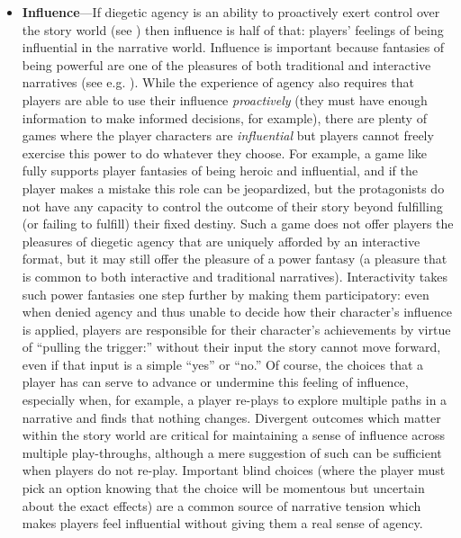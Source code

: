 \begin{itemize}
\item \textbf{Influence}---If diegetic agency is an ability to proactively exert control over the story world (see \citep{Mason2013}) then influence is half of that: players' feelings of being influential in the narrative world.
%
Influence is important because fantasies of being powerful are one of the pleasures of both traditional and interactive narratives (see e.g. \citep{Olson2008}).
%
While the experience of agency also requires that players are able to use their influence \emph{proactively} (they must have enough information to make informed decisions, for example), there are plenty of games where the player characters are \emph{influential} but players cannot freely exercise this power to do whatever they choose.
%
For example, a game like  \citep{FinalFantasy} fully supports player fantasies of being heroic and influential, and if the player makes a mistake this role can be jeopardized, but the protagonists do not have any capacity to control the outcome of their story beyond fulfilling (or failing to fulfill) their fixed destiny.
%
Such a game does not offer players the pleasures of diegetic agency that are uniquely afforded by an interactive format, but it may still offer the pleasure of a power fantasy (a pleasure that is common to both interactive and traditional narratives).
%
Interactivity takes such power fantasies one step further by making them participatory: even when denied agency and thus unable to decide how their character's influence is applied, players are responsible for their character's achievements by virtue of ``pulling the trigger:'' without their input the story cannot move forward, even if that input is a simple ``yes'' or ``no.''
%
Of course, the choices that a player has can serve to advance or undermine this feeling of influence, especially when, for example, a player re-plays to explore multiple paths in a narrative and finds that nothing changes.
%
Divergent outcomes which matter within the story world are critical for maintaining a sense of influence across multiple play-throughs, although a mere suggestion of such can be sufficient when players do not re-play.
%
Important blind choices (where the player must pick an option knowing that the choice will be momentous but uncertain about the exact effects) are a common source of narrative tension which makes players feel influential without giving them a real sense of agency.



\end{itemize}

